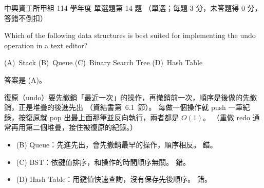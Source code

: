 \begin{pastexam}[label={px:nchu-114-dsa-14}]{中興資工所甲組 114 學年度 單選題第 14 題}
（單選；每題 3 分，未答題得 0 分，答錯不倒扣）

Which of the following data structures is best suited for implementing the undo operation in a text editor?

(A)~Stack \qquad (B)~Queue \qquad (C)~Binary Search Tree \qquad (D)~Hash Table
\end{pastexam}

\begin{pastsoln}
答案是 (A)。

復原（undo）要先撤銷「最近一次」的操作，再撤銷前一次，順序是後做的先撤銷，正是堆疊的後進先出
（資結書第~6.1~節）。 每做一個操作就 push 一筆紀錄，按復原就 pop 出最上面那筆並反向執行，兩者都是 $O(1)$。
（重做 redo 通常再用第二個堆疊，接住被復原的紀錄。）
\begin{itemize}
\item (B) Queue：先進先出，會先撤銷最早的操作，順序相反。 錯。
\item (C) BST：依鍵值排序，和操作的時間順序無關。 錯。
\item (D) Hash Table：用鍵值快速查詢，沒有保存先後順序。 錯。
\end{itemize}
\end{pastsoln}
